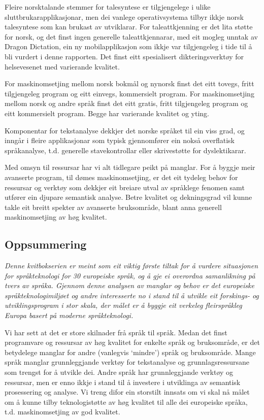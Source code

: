 \begin{multicols}{2}
Fleire norsktalande stemmer for talesyntese er tilgjengelege i ulike sluttbrukarapplikasjonar, men dei vanlege operativsystema tilbyr ikkje norsk talesyntese som kan brukast av utviklarar. 
For taleattkjenning er det lita støtte for norsk, og det finst ingen generelle taleattkjennarar, med eit mogleg unntak av Dragon Dictation, ein ny mobilapplikasjon som ikkje var tilgjengeleg i tide til å bli vurdert i denne rapporten.
Det finst eitt spesialisert dikteringsverktøy for helsevesenet med varierande kvalitet.

For maskinomsetjing mellom norsk bokmål og nynorsk finst det eitt tovegs, fritt tilgjengeleg program og eitt einvegs, kommersielt program. 
For maskinomsetjing mellom norsk og andre språk finst det eitt gratis, fritt tilgjengeleg program og eitt kommersielt program. Begge har varierande kvalitet og yting.

Komponentar for tekstanalyse dekkjer det norske språket til ein viss grad, og inngår i fleire applikasjonar som typisk gjennomfører ein nokså overflatisk språkanalyse, t.d. generelle stavekontrollar eller skrivestøtte for dyslektikarar.

Med omsyn til ressursar har vi alt tidlegare peikt på manglar.
For å byggje meir avanserte program, til dømes maskinomsetjing, er det eit tydeleg behov for ressursar og verktøy som dekkjer eit breiare utval av språklege fenomen samt utfører ein djupare semantisk analyse. Betre kvalitet og dekningsgrad vil kunne takle eit breitt spekter av avanserte bruksområde, blant anna generell maskinomsetjing av høg kvalitet.

\subsection{Oppsummering}

\emph{Denne kvitbokserien er meint som eit viktig første tiltak for å vurdere situasjonen for språkteknologi for 30 europeiske språk, og å gje ei overordna samanlikning på tvers av språka. Gjennom denne analysen av manglar og behov er det europeiske språkteknologimiljøet og andre interesserte no i stand til å utvikle eit forskings- og utviklingsprogram i stor skala, der målet er å byggje eit verkeleg fleirspråkleg Europa basert på moderne språkteknologi.}

Vi har sett at det er store skilnader frå språk til språk. Medan det finst programvare og ressursar av høg kvalitet for enkelte språk og bruksområde, er det betydelege manglar for andre (vanlegvis `mindre') språk og bruksområde. Mange språk manglar grunnleggjande verktøy for tekstanalyse og grunnlagsressursane som trengst for å utvikle dei. Andre språk har grunnleggjande verktøy og ressursar, men er enno ikkje i stand til å investere i utviklinga av semantisk prosessering og analyse. Vi treng difor ein storstilt innsats om vi skal nå målet om å kunne tilby teknologistøtte av høg kvalitet til alle dei europeiske språka, t.d. maskinomsetjing av god kvalitet.


\end{multicols}
